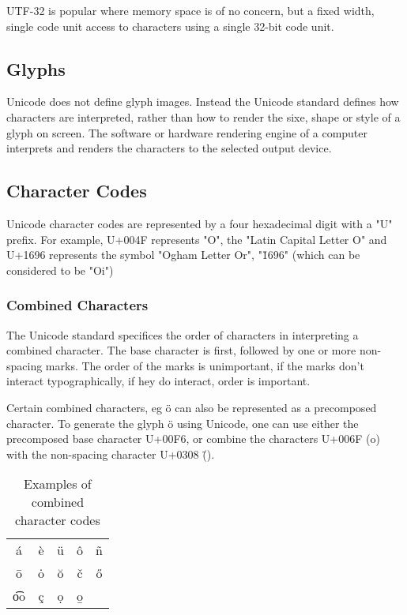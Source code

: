 UTF-32 is popular where memory space is of no concern, but a fixed
width, single code unit access to characters using a single 32-bit code
unit.

\subsection{Glyphs}

Unicode does not define glyph images. Instead the Unicode standard
defines how characters are interpreted, rather than how to render the
sixe, shape or style of a glyph on screen. The software or hardware 
rendering engine of a computer interprets and renders the characters to 
the selected output device.

\subsection{Character Codes}

Unicode character codes are represented by a four hexadecimal digit with
a "U" prefix. For example, U+004F represents "O", the "Latin Capital 
Letter O" and U+1696 represents the symbol "Ogham Letter Or", "\u1696"
(which can be considered to be "Oi")

\tofix

\subsubsection{Combined Characters}

The Unicode standard specifices the order of characters in interpreting 
a combined character. The base character is first, followed by one or
more non-spacing marks. The order of the marks is unimportant, if the 
marks don't interact typographically, if hey do interact, order is
important.


Certain combined characters, eg \"{o} can also be represented as a
precomposed character. To generate the glyph \"{o} using Unicode, one
can use either the precomposed base character U+00F6, or combine the
characters U+006F (o) with the non-spacing character U+0308 (\"{ }).

\begin{table}

\begin{center}

\begin{tabular}{ccccc}
\'{a}	&	\`{e}	&	\"{u}	&	\^{o}	&	\~{n}	\\
\={o}	&	\.{o}	&	\u{o}	&	\v{c}	&	\H{o}	\\
\t{oo}&	\c{c}	&	\d{o}	&	\b{o}	&			\\
\end{tabular}

\end{center}

\caption{Examples of combined character codes}

\end{table}

